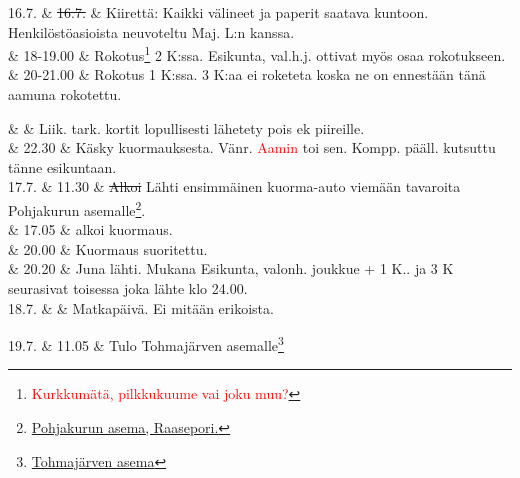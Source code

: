 \documentclass[11pt,a5paper,oneside]{book}
\begin{document}
16.7. & \sout{16.7.} & Kiirettä: Kaikki välineet ja paperit saatava kuntoon. Henkilöstöasioista neuvoteltu Maj. L:n kanssa. \newline \\

& 18-19.00 & Rokotus\footnote{\textcolor{red}{Kurkkumätä, pilkkukuume vai joku muu?}} 2 K:ssa. Esikunta, val.h.j. ottivat myös osaa rokotukseen. \newline \\

& 20-21.00 & Rokotus 1 K:ssa. 3 K:aa ei roketeta koska ne on ennestään tänä aamuna rokotettu.\\
\newpage

& & Liik. tark. kortit lopullisesti lähetety pois ek piireille.\newline \\

& 22.30 & Käsky kuormauksesta. Vänr. \textcolor{red}{Aamin} toi sen. Kompp. pääll. kutsuttu tänne esikuntaan. \newline\newline\newline \\

17.7. & 11.30 & \sout{Alkoi} Lähti ensimmäinen kuorma-auto viemään tavaroita Pohjakurun asemalle\footnote{\href{https://www.google.fi/maps/place/60\%C2\%B005'53.9\%22N+23\%C2\%B033'07.7\%22E/}{Pohjakurun asema, Raasepori.}}. \\

& 17.05 & alkoi kuormaus. \\

& 20.00 & Kuormaus suoritettu. \\

& 20.20 & Juna lähti. Mukana Esikunta, valonh. joukkue + 1 K.. ja 3 K seurasivat toisessa joka lähte klo 24.00. \newline \\

18.7. & & Matkapäivä. Ei mitään erikoista. \\	

\taulustop


19.7. & 11.05 & Tulo Tohmajärven asemalle\footnote{\href{https://www.google.fi/maps/place/62\%C2\%B014'36.0\%22N+30\%C2\%B021'21.4\%22E/}{Tohmajärven asema}} \\
\end{document}
